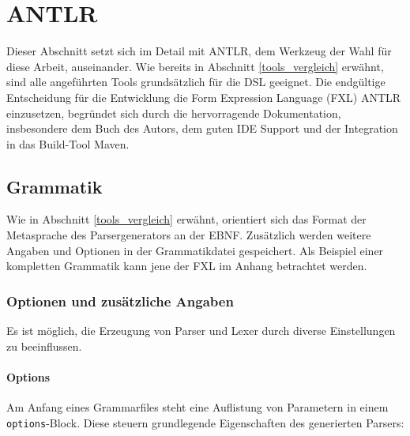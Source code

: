 \section{ANTLR}
\label{tools_antlr}
Dieser Abschnitt setzt sich im Detail mit ANTLR, dem Werkzeug der Wahl für diese Arbeit, auseinander. Wie bereits in Abschnitt \ref{tools_vergleich} erwähnt, sind alle angeführten Tools grund\-sätz\-lich für die DSL geeignet. Die endgültige Entscheidung für die Entwicklung die Form Expression Language (FXL) ANTLR einzusetzen, begründet sich durch die hervorragende Dokumentation, insbesondere dem Buch des Autors, dem guten IDE Support und der Integration in das Build-Tool Maven.


\subsection{Grammatik}

Wie in Abschnitt \ref{tools_vergleich} erwähnt, orientiert sich das Format der Metasprache des Parsergenerators an der EBNF. Zu\-sätz\-lich werden weitere Angaben und Optionen in der Grammatikdatei gespeichert. Als Beispiel einer kompletten Grammatik kann jene der FXL im Anhang betrachtet werden.

\subsubsection{Optionen und zusätzliche Angaben}

Es ist möglich, die Erzeugung von Parser und Lexer durch diverse Einstellungen zu beeinflussen.

\paragraph{Options}

Am Anfang eines Grammarfiles steht eine Auflistung von Parametern in einem \texttt{options}-Block. Diese steuern grundlegende Eigenschaften des generierten Parsers:

